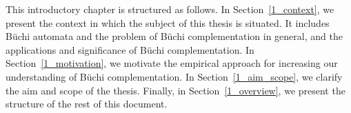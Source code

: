 
This introductory chapter is structured as follows. In Section~\ref{1_context}, we present the context in which the subject of this thesis is situated. It includes Büchi automata and the problem of Büchi complementation in general, and the applications and significance of Büchi complementation. In Section~\ref{1_motivation}, we motivate the empirical approach for increasing our understanding of Büchi complementation. In Section~\ref{1_aim_scope}, we clarify the aim and scope of the thesis. Finally, in Section~\ref{1_overview}, we present the structure of the rest of this document.





